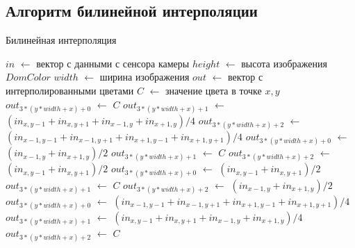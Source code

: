 \subsection{Алгоритм билинейной интерполяции}
\clearpage
\begin{algorithm}[H]
	\caption{Билинейная интерполяция}
	\label{alg:analchange}
	\begin{algorithmic}[1]
		\State $in$ $\gets$ вектор с данными с сенсора камеры
		\State $height$ $\gets$ высота изображения $DomColor$
		\State $width$ $\gets$ ширина изображения
		\State $out$ $\gets$ вектор с интерполированными цветами
			\State $C$ $\gets$ значение цвета в точке $x,y$
					\State $out_{3 * (y * width + x) + 0}$ $\gets$ $C$
					\State $out_{3 * (y * width + x) + 1}$ $\gets$ $(in_{x, y-1} + in_{x, y + 1} + in_{x - 1, y} + in_{x + 1, y}) / 4$
					\State $out_{3 * (y * width + x) + 2}$ $\gets$ $(in_{x-1, y-1} + in_{x-1, y+1} + in_{x+1, y-1} + in_{x+1, y+1}) / 4$
				\Else
					\State $out_{3 * (y * width + x) + 0}$ $\gets$ $(in_{x-1, y} + in_{x+1, y}) / 2$
					\State $out_{3 * (y * width + x) + 1}$ $\gets$ $C$
					\State $out_{3 * (y * width + x) + 2}$ $\gets$ $(in_{x, y - 1} + in_{x, y+1}) / 2$
				\EndIf
			\Else
					\State $out_{3 * (y * width + x) + 0}$ $\gets$ $(in_{x, y - 1} + in_{x, y+1}) / 2$
					\State $out_{3 * (y * width + x) + 1}$ $\gets$ $C$
					\State $out_{3 * (y * width + x) + 2}$ $\gets$ $(in_{x-1, y} + in_{x+1, y}) / 2$
				\Else
					\State $out_{3 * (y * width + x) + 0}$ $\gets$ $(in_{x-1, y-1} + in_{x-1, y+1} + in_{x+1, y-1} + in_{x+1, y+1}) / 4$
					\State $out_{3 * (y * width + x) + 1}$ $\gets$ $(in_{x, y-1} + in_{x, y + 1} + in_{x - 1, y} + in_{x + 1, y}) / 4$
					\State $out_{3 * (y * width + x) + 2}$ $\gets$ $C$
				\EndIf
			\EndIf
		\EndFor
	\EndFor
	\end{algorithmic}
\end{algorithm}

